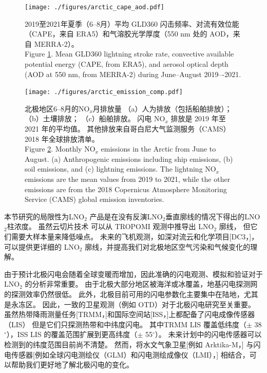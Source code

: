 \begin{figure}[!htbp]
\centering
\texttt{[image: ./figures/arctic\_cape\_aod.pdf]}
\caption{
2019至2021年夏季（6--8月）平均 GLD360 闪击频率、对流有效位能（CAPE，来自 ERA5）和气溶胶光学厚度（550 nm 处的 AOD，来自 MERRA-2）。\\
Figure \ref{fig:arctic_cape_aod}.
Mean GLD360 lightning stroke rate, convective available potential energy (CAPE, from ERA5), and aerosol optical depth (AOD at 550 nm, from MERRA-2) during June--August 2019–-2021.
}
\label{fig:arctic_cape_aod}
\end{figure}


\begin{figure}[!htbp]
\centering
\texttt{[image: ./figures/arctic\_emission\_comp.pdf]}
\caption{
北极地区6--8月的NO$_x$月排放量
（a）人为排放（包括船舶排放）；（b）土壤排放；
（c）船舶排放。
闪电 NO$_x$ 排放是 2019 年至 2021 年的平均值。
其他排放来自哥白尼大气监测服务（CAMS）2018 年全球排放清单。\\
Figure \ref{fig:arctic_emission_comp}. Monthly NO$_x$ emissions in the Arctic from June to August.
(a) Anthropogenic emissions including ship emissions, (b) soil emissions, and (c) lightning emissions.
The lightning NO$_x$ emissions are the mean values from 2019 to 2021, while the other emissions are from the 2018 Copernicus Atmosphere Monitoring Service (CAMS) global emission inventories.
}
\label{fig:arctic_emission_comp}
\end{figure}


本节研究的局限性为LNO$_2$ 产品是在没有反演LNO$_2$垂直廓线的情况下得出的LNO$_2$柱浓度。
虽然云切片技术 \citep{BelmonteRivas.2015,Marais.2021} 可以从 TROPOMI 观测中推导出 LNO$_2$ 廓线，
但它们需要大样本量来降低噪点。
未来的飞机观测，如深对流云和化学项目[DC3，\citet{Barth.2019}]，
可以提供更详细的 LNO$_2$ 廓线，并提高我们对北极地区空气污染和气候变化的理解\citep{Law.2007,Schmale.2018}。

由于预计北极闪电会随着全球变暖而增加，因此准确的闪电观测、模拟和验证对于 LNO$_2$ 的分析非常重要。
由于北极大部分地区被海洋或冰覆盖，地基闪电探测网的探测效率仍然很低\citep{Vagasky.2022}。
此外，北极目前可用的闪电参数化主要集中在陆地，尤其是永冻区\citep{Chen.2021a}。
因此，一致的卫星观测（例如 OTD）对于北极闪电研究至关重要。
虽然热带降雨测量任务[TRMM，\citet{Cecil.2014}]和国际空间站[ISS，\citet{Blakeslee.2020}]上都配备了闪电成像传感器（LIS）
但是它们只探测热带和中纬度闪电。
其中TRMM LIS 覆盖低纬度（$\pm$ 38$^{\circ}$），ISS LIS 的覆盖范围扩展到更高纬度（$\pm$ 55$^{\circ}$）。
未来计划中的闪电传感器可以检测到的纬度范围目前尚不清楚。
然而，将水文气象卫星[例如 Arktika-M，\citet{Asmus.2021}]
与闪电传感器[例如全球闪电测绘仪（GLM）和闪电测绘成像仪（LMI），\citet{Goodman.2013,Yang.2017}] 相结合，可以帮助我们更好地了解北极闪电的变化。


